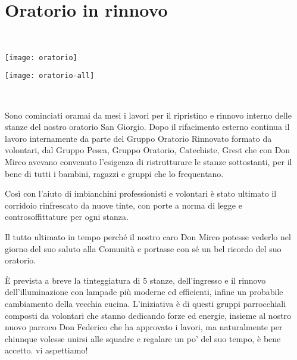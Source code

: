 \section{Oratorio in rinnovo}

\begin{figure*}[!b]
  \begin{minipage}{0.1\textwidth}
    ~
  \end{minipage}
  \begin{minipage}{0.26\textwidth}
    \texttt{[image: oratorio]}
  \end{minipage}
  \hfill
  \begin{minipage}{0.44\textwidth}
    \texttt{[image: oratorio-all]}
  \end{minipage}
  \begin{minipage}{0.1\textwidth}
    ~
  \end{minipage}
\end{figure*}

Sono cominciati oramai da mesi i lavori per il ripristino e rinnovo interno delle stanze del nostro oratorio San Giorgio. Dopo il rifacimento esterno continua il lavoro internamente da parte del Gruppo Oratorio Rinnovato formato da volontari, dal Gruppo Pesca, Gruppo Oratorio, Catechiste, Grest che con Don Mirco avevano convenuto l’esigenza di ristrutturare le stanze sottostanti, per il bene di tutti i bambini, ragazzi e gruppi che lo frequentano.

Così con l’aiuto di imbianchini professionisti e volontari è stato ultimato il corridoio rinfrescato da nuove tinte, con porte a norma di legge e controsoffittature per ogni stanza.

Il tutto ultimato in tempo perché il nostro caro Don Mirco potesse vederlo nel giorno del suo saluto alla Comunità e portasse con sé un bel ricordo del suo oratorio.

È prevista a breve la tinteggiatura di 5 stanze, dell’ingresso e il rinnovo dell’illuminazione con lampade più moderne ed efficienti, infine un probabile cambiamento della vecchia cucina. L’iniziativa è di questi gruppi parrocchiali composti da volontari che stanno dedicando forze ed energie, insieme al nostro nuovo parroco Don Federico che ha approvato i lavori, ma naturalmente per chiunque volesse unirsi alle squadre e regalare un po’ del suo tempo, è bene accetto. vi aspettiamo!

